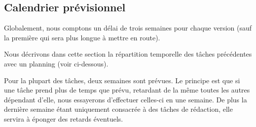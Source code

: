 \documentclass{article}
\begin{document}
\subsection{\label{calendrier}Calendrier prévisionnel}

Globalement, nous comptons un délai de trois semaines pour chaque version (sauf la première qui sera plus longue à mettre en route).

Nous décrivons dans cette section la répartition temporelle des tâches précédentes avec un planning (voir ci-dessous).

Pour la plupart des tâches, deux semaines sont prévues. Le principe est que si une tâche prend plus de temps que prévu, retardant de la même toutes les autres dépendant d'elle, nous essayerons d'effectuer celles-ci en une semaine. De plus la dernière semaine étant uniquement consacrée à des tâches de rédaction, elle servira à éponger des retards éventuels.

\newpage

\end{document}
